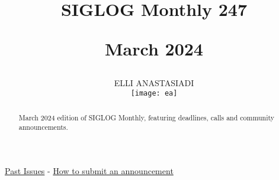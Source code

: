 \documentclass[prodmode,acmtecs]{acmsmall} %
\newcounter{colstart}
\begin{document}
\setcounter{colstart}{\thepage}

\title{{\huge\sc SIGLOG Monthly 247}

 March 2024}
\author{ELLI ANASTASIADI
\vspace*{-2.6cm}\begin{flushright}\texttt{[image: ea]}\end{flushright}
}

\begin{abstract}
March 2024 edition of SIGLOG Monthly, featuring deadlines, calls and community announcements.
\end{abstract}


\maketitlee

\href{https://lics.siglog.org/newsletters/}{Past Issues}
 - 
\href{https://lics.siglog.org/newsletters/inst.html}{How to submit an announcement}
\end{document}
